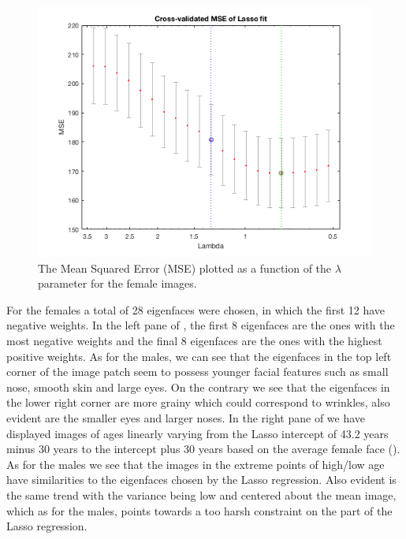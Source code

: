 \begin{figure}[ht!]
    \centering
    \includegraphics[width=0.8\linewidth]{fig/MSE_F_40.png}
    \caption{The Mean Squared Error (MSE) plotted as a function of the $\lambda$ parameter for the female images.}
    \label{fig:F_MSE}
\end{figure}

For the females a total of 28 eigenfaces were chosen, in which the first 12 have negative weights. In the left pane of , the first 8 eigenfaces are the ones with the most negative weights and the final 8 eigenfaces are the ones with the highest positive weights. As for the males, we can see that the eigenfaces in the top left corner of the image patch seem to possess younger facial features such as small nose, smooth skin and large eyes. On the contrary we see that the eigenfaces in the lower right corner are more grainy which could correspond to wrinkles, also evident are the smaller eyes and larger noses. In the right pane of  we have displayed images of ages linearly varying from the Lasso intercept of 43.2 years minus 30 years to the intercept plus 30 years based on the average female face (). As for the males we see that the images in the extreme points of high/low age have similarities to the eigenfaces chosen by the Lasso regression. Also evident is the same trend with the variance being low and centered about the mean image, which as for the males, points towards a too harsh constraint on the part of the Lasso regression.

